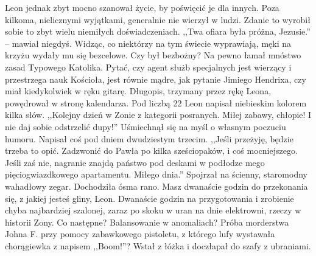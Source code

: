 \documentclass[../MAIN.tex]{subfiles}
\begin{document}
Leon jednak zbyt mocno szanował życie, by poświęcić je dla innych. Poza kilkoma, nielicznymi wyjątkami, generalnie nie wierzył w ludzi. Zdanie to wyrobił sobie to zbyt wielu niemiłych doświadczeniach. ,,Twa ofiara była próżna, Jezusie.'' -- mawiał niegdyś. Widząc, co niektórzy na tym świecie wyprawiają, męki na krzyżu wydały mu się bezcelowe. Czy był bezbożny? Na pewno łamał mnóstwo zasad Typowego Katolika. Pytać, czy agent służb specjalnych jest wierzący i przestrzega nauk Kościoła, jest równie mądre, jak pytanie Jimiego Hendrixa, czy miał kiedykolwiek w ręku gitarę.
Długopis, trzymany przez rękę Leona, powędrował w stronę kalendarza. Pod liczbą 22 Leon napisał niebieskim kolorem kilka słów.
,,Kolejny dzień w Zonie z kategorii posranych. Miłej zabawy, chłopie! I nie daj sobie odstrzelić dupy!''
Uśmiechnął się na myśl o własnym poczuciu humoru. Napisał coś pod dniem dwudziestym trzecim.
,,Jeśli przeżyję, będzie trzeba to opić. Zadzwonić do Pawła po kilka sześciopaków, i coś mocniejszego. Jeśli zaś nie, nagranie znajdą państwo pod deskami w podłodze mego pięciogwiazdkowego apartamentu. Miłego dnia.''
Spojrzał na ścienny, staromodny wahadłowy zegar. Dochodziła ósma rano. Masz dwanaście godzin do przekonania się, z jakiej jesteś gliny, Leon. Dwanaście godzin na przygotowania i zrobienie chyba najbardziej szalonej, zaraz po skoku w uran na dnie elektrowni, rzeczy w historii Zony. Co następne? Balansowanie w anomaliach? Próba morderstwa Johna F. przy pomocy zabawkowego pistoletu, z którego lufy wystawała chorągiewka z napisem ,,Boom!''?
Wstał z łóżka i doczłapał do szafy z ubraniami.
\end{document}

